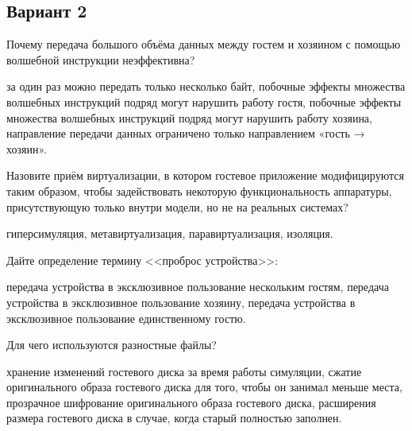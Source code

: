 \subsection*{Вариант 2}

\begin{questions}

\question[3] Почему передача большого объёма данных между гостем и хозяином с помощью волшебной инструкции неэффективна?
\begin{choices}
\correctchoice за один раз можно передать только несколько байт,
\choice побочные эффекты множества волшебных инструкций подряд могут нарушить работу гостя,
\choice побочные эффекты множества волшебных инструкций подряд могут нарушить работу хозяина,
\choice направление передачи данных ограничено только направлением «гость → хозяин».
\end{choices}

\question[3] Назовите приём виртуализации, в котором гостевое приложение модифицируются таким образом, чтобы задействовать некоторую функциональность аппаратуры, присутствующую только внутри модели, но не на реальных системах?
\begin{choices}
\choice гиперсимуляция,
\choice метавиртуализация,
\correctchoice  паравиртуализация,
\choice изоляция.
\end{choices}

\question[3] Дайте определение термину <<проброс устройства>>:
\begin{choices}
\choice передача устройства в эксклюзивное пользование нескольким гостям,
\choice передача устройства в эксклюзивное пользование хозяину,
\correctchoice передача устройства в эксклюзивное пользование единственному гостю.
\end{choices}

\question[3] Для чего используются разностные файлы?
\begin{choices}
\correctchoice хранение изменений гостевого диска за время работы симуляции,
\choice сжатие оригинального образа гостевого диска для того, чтобы он занимал меньше места,
\choice прозрачное шифрование оригинального образа гостевого диска,
\choice расширения размера гостевого диска в случае, когда старый полностью заполнен.
\end{choices}

\end{questions}

